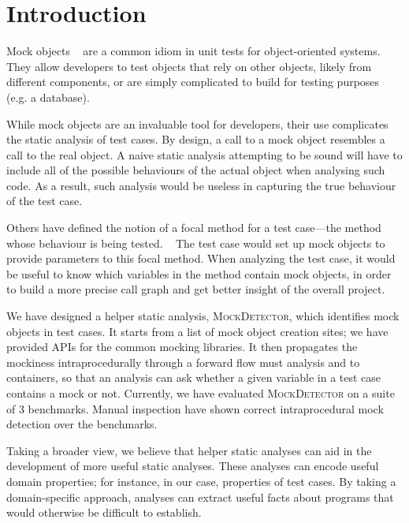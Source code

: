 \section{Introduction}
\label{sec:introduction}

Mock objects ~\cite{beck02:_test_driven_devel} are a common idiom in
unit tests for object-oriented systems.  They allow developers to test objects that 
rely on other objects, likely from different components, or are simply complicated 
to build for testing purposes (e.g. a database).

While mock objects are an invaluable tool for developers, their use
complicates the static analysis of test cases. 
By design, a call to a mock object resembles a call to the real object. 
A naive static analysis attempting to be sound will have to include all of 
the possible behaviours of the actual object when analysing such code. 
As a result, such analysis would be useless in capturing the true behaviour 
of the test case.

Others have defined the notion of a focal method for a test case---the method
whose behaviour is being tested. ~\cite{7335402}
The test case would set up mock objects to provide parameters to this focal method.
When analyzing the test case, it would be useful to know which variables in the
method contain mock objects, in order to build a more precise call graph and get 
better insight of the overall project.

We have designed a helper static analysis, \textsc{MockDetector}, which identifies
mock objects in test cases. It starts from a list of mock object creation sites; we
have provided APIs for the common mocking libraries. It then propagates the mockiness
intraprocedurally through a forward flow must analysis and to containers, so that an analysis
can ask whether a given variable in a test case contains a mock or not. Currently, we have
evaluated \textsc{MockDetector} on a suite of 3 benchmarks. Manual inspection have shown 
correct intraprocedural mock detection over the benchmarks. 

Taking a broader view, we believe that helper static analyses can aid
in the development of more useful static analyses. These analyses can
encode useful domain properties; for instance, in our case, properties
of test cases. By taking a domain-specific approach, analyses can extract
useful facts about programs that would otherwise be difficult to establish.

